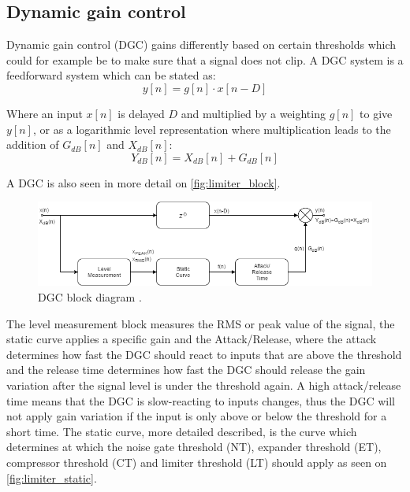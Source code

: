 \subsection*{Dynamic gain control}
Dynamic gain control (DGC) gains differently based on certain thresholds which could for example be to make sure that a signal does not clip. A DGC system is a feedforward system which can be stated as:
\begin{equation}
y[n] = g[n]\cdot x[n-D]
\end{equation}

Where an input $x[n]$ is delayed $D$ and multiplied by a weighting $g[n]$ to give $y[n]$, or as a logarithmic level representation where multiplication leads to the addition of $G_{dB}[n]$ and $X_{dB}[n]$:
\begin{equation}
Y_{dB}[n] = X_{dB}[n] + G_{dB}[n]
\end{equation}

A DGC is also seen in more detail on \autoref{fig:limiter_block}.

\begin{figure}[H]
\centering
\includegraphics[width=1\textwidth]{figures/Limiter_block.png}
\caption{DGC block diagram \citep{dynamicGainPic}.}
\label{fig:limiter_block}
\end{figure}   

The level measurement block measures the RMS or peak value of the signal, the static curve applies a specific gain and the Attack/Release, where the attack determines how fast the DGC should react to inputs that are above the threshold and the release time determines how fast the DGC should release the gain variation after the signal level is under the threshold again. A high attack/release time means that the DGC is slow-reacting to inputs changes, thus the DGC will not apply gain variation if the input is only above or below the threshold for a short time.
The static curve, more detailed described, is the curve which determines at which the noise gate threshold (NT), expander threshold (ET), compressor threshold (CT) and limiter threshold (LT) should apply as seen on \autoref{fig:limiter_static}. 

